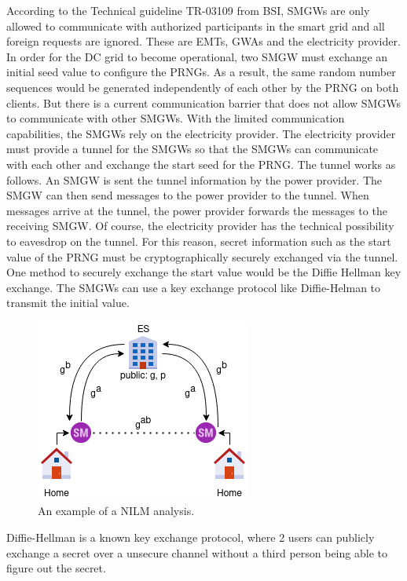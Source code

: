 According to the Technical guideline TR-03109 from BSI, SMGWs are only allowed to communicate with authorized participants in the smart grid and all foreign requests are ignored. These are EMTs, GWAs and the electricity provider. In order for the DC grid to become operational, two SMGW must exchange an initial seed value to configure the PRNGs. %
As a result, the same random number sequences would be generated independently of each other by the PRNG on both clients. But there is a current communication barrier that does not allow SMGWs to communicate with other SMGWs. With the limited communication capabilities, the SMGWs rely on the electricity provider. The electricity provider must provide a tunnel for the SMGWs so that the SMGWs can communicate with each other and exchange the start seed for the PRNG. The tunnel works as follows. An SMGW is sent the tunnel information by the power provider. The SMGW can then send messages to the power provider to the tunnel. When messages arrive at the tunnel, the power provider forwards the messages to the receiving SMGW. Of course, the electricity provider has the technical possibility to eavesdrop on the tunnel. For this reason, secret information such as the start value of the PRNG must be cryptographically securely exchanged via the tunnel. One method to securely exchange the start value would be the Diffie Hellman key exchange.%
The SMGWs can use a key exchange protocol like Diffie-Helman to transmit the initial value. %
\begin{figure}[tbp]
  \centering
  \includegraphics[scale=0.7]{images/key_exchange.png}
  \caption[Short description]{An example of a NILM analysis.}
  \label{fig:Appliance_Model}
\end{figure}
Diffie-Hellman is a known key exchange protocol, where 2 users can publicly exchange a secret over a unsecure channel without a third person being able to figure out the secret. 
